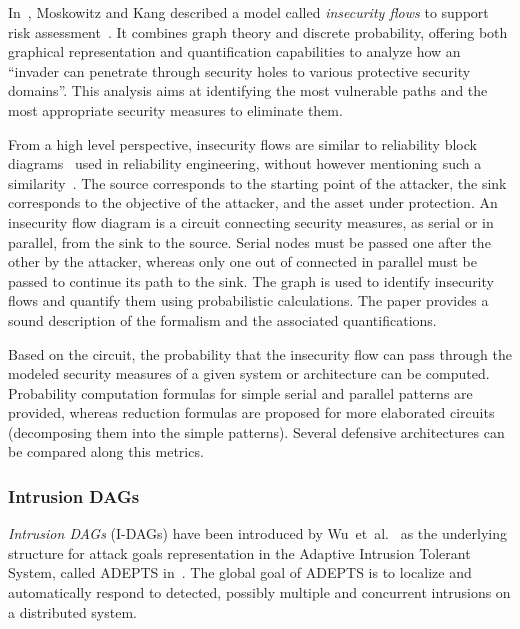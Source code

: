 \documentclass[a4paper]{article}
\begin{document}
In~, Moskowitz and Kang described a model called \emph{insecurity flows}
to support risk assessment~\cite{MoKa}. It combines graph theory and discrete
probability, offering both graphical representation and quantification
capabilities to analyze how an ``invader can penetrate through security holes
to various protective security domains''. This analysis aims at identifying the
most vulnerable paths and the most appropriate security measures to eliminate
them.

From a high level perspective, insecurity flows are similar to reliability
block diagrams~\cite{Elec} used in reliability engineering, without however
mentioning such a similarity~\cite{MoKa}. The source corresponds to the
starting point of the attacker, the sink corresponds to the objective of the
attacker, and the asset under protection. An insecurity flow diagram is a
circuit connecting security measures, as serial or in parallel,
from the sink to the source. Serial nodes must be passed one after
the other by the attacker, whereas only one out of  connected
in parallel must be passed to continue its path to the sink.
The graph is used to identify insecurity flows and quantify them
using probabilistic calculations. The paper provides a sound description of
the formalism and the associated quantifications.

Based on the circuit, the probability that the insecurity flow can pass
through the modeled security measures of a given system or architecture can be
computed. Probability computation formulas for simple serial and parallel
patterns are provided, whereas reduction formulas are proposed for more
elaborated circuits (decomposing them into the simple patterns).
Several defensive architectures can be compared along this metrics.

\subsubsection{Intrusion DAGs} 
\label{sec:i-dag}

\emph{Intrusion DAGs} (I-DAGs) have been introduced by 
Wu~et~al.~\cite{BagchiTech} as the underlying structure  for attack goals
representation in the Adaptive Intrusion Tolerant System, called ADEPTS
in~. The global goal of ADEPTS is to localize and automatically respond to
detected, possibly multiple and concurrent intrusions  on a distributed system. 
\end{document}
